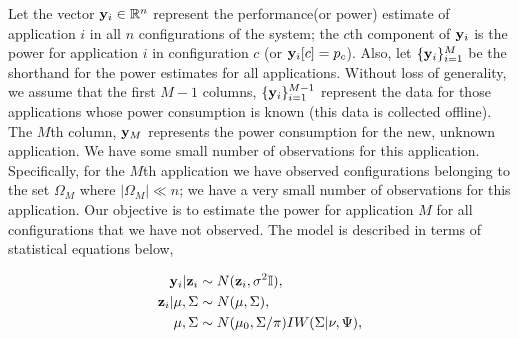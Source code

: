 Let the vector $\mathbf{y}_i \in \mathbb{R}^{n}$ represent the performance(or power) estimate of application $i$ in all $n$ configurations of the
system; \ie the $c$th component of $\mathbf{y}_i$ is the power for application
$i$ in configuration $c$ (or $\mathbf{y}_i[c] = p_c$).  Also, let $\{\mathbf{y}_i\}_{i =1}^M$ be the shorthand for the power estimates for all applications.  Without loss of generality, we assume that the first $M-1$
columns, \ie $\{\mathbf{y}_i\}_{i =1}^{M-1}$ represent the data for those
applications whose power consumption is known (this data is collected
offline).  The $M$th column, $\mathbf{y}_M$ represents the power consumption
for the new, unknown application.  We have some small number of
observations for this application.  Specifically, for the $M$th application we have observed
configurations belonging to the set $\Omega_M$ where $|\Omega_M| \ll
n$; \ie we have a very small number of observations for this
application.  Our objective is to estimate the power for application
$M$ for all configurations that we have not observed.
The model is described in terms of statistical equations below,

\begin{equation}
\begin{aligned}
\mathbf{y}_i \vert \mathbf{z}_i  &\sim N( \mathbf{z}_i, \sigma^2 \mathbb{I}),\\
\mathbf{z}_i \vert \mu,\Sigma &\sim N(\mu, \Sigma),\\
\mu, \Sigma &\sim N(\mu_0,\Sigma / \pi)IW(\Sigma | \nu, \Psi),
\end{aligned}
\label{eq:HBN}
\end{equation}

